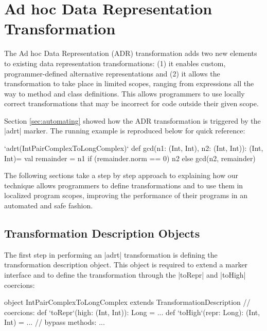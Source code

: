 \section{Ad hoc Data Representation Transformation}
\label{sec:ildl}

The Ad hoc Data Representation (ADR) transformation adds two new elements to existing data representation transformations: (1) it enables custom, programmer-defined alternative representations and (2) it allows the transformation to take place in limited scopes, ranging from expressions all the way to method and class definitions. This allows programmers to use locally correct transformations that may be incorrect for code outside their given scope.

Section \ref{sec:automating} showed how the ADR transformation is triggered by the |adrt| marker. The running example is reproduced below for quick reference:

\begin{lstlisting-nobreak}
`adrt(IntPairComplexToLongComplex)` {
  def gcd(n1: (Int, Int), n2: (Int, Int)): (Int, Int)={
    val remainder = n1 %
    if (remainder.norm == 0) n2 else gcd(n2, remainder)
  }
}
\end{lstlisting-nobreak}

The following sections take a step by step approach to explaining how our technique allows programmers to define transformations and to use them in localized program scopes,  improving the performance of their programs in an automated and safe fashion.


\subsection{Transformation Description Objects}
\label{sec:ildl:custom}

The first step in performing an |adrt| transformation is defining the transformation description object. This object is required to extend a marker interface and to define the transformation through the |toRepr| and |toHigh| coercions:

\begin{lstlisting-nobreak}
object IntPairComplexToLongComplex
          extends TransformationDescription {
  // coercions:
  def `toRepr`(high: (Int, Int)): Long = ...
  def `toHigh`(repr: Long): (Int, Int) = ...
  // bypass methods:
  ...
}
\end{lstlisting-nobreak}

